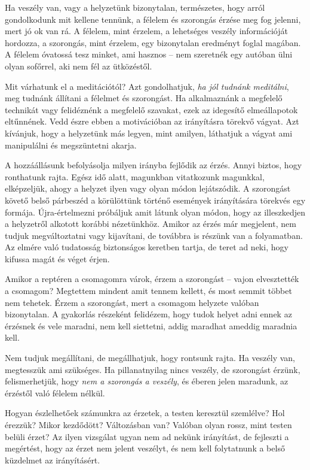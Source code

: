 
Ha veszély van, vagy a helyzetünk bizonytalan, természetes, hogy arról
gondolkodunk mit kellene tennünk, a félelem és szorongás érzése meg fog
jelenni, mert jó ok van rá. A félelem, mint érzelem, a lehetséges
veszély információját hordozza, a szorongás, mint érzelem, egy
bizonytalan eredményt foglal magában. A félelem óvatossá tesz minket,
ami hasznos -- nem szeretnék egy autóban ülni olyan sofőrrel, aki nem
fél az ütközéstől.

Mit várhatunk el a meditációtól? Azt gondolhatjuk, \emph{ha jól tudnánk
meditálni}, meg tudnánk állítani a félelmet és szorongást. Ha
alkalmaznánk a megfelelő technikát vagy felidéznénk a megfelelő
szavakat, ezek az idegesítő elmeállapotok eltűnnének. Vedd észre ebben a
motivációban az irányításra törekvő vágyat. Azt kívánjuk, hogy a
helyzetünk más legyen, mint amilyen, láthatjuk a vágyat ami manipulálni
és megszüntetni akarja.

A hozzáállásunk befolyásolja milyen irányba fejlődik az érzés. Annyi
biztos, hogy ronthatunk rajta. Egész idő alatt, magunkban vitatkozunk
magunkkal, elképzeljük, ahogy a helyzet ilyen vagy olyan módon
lejátszódik. A szorongást követő belső párbeszéd a körülöttünk történő
események irányítására törekvés egy formája. Újra-értelmezni próbáljuk
amit látunk olyan módon, hogy az illeszkedjen a helyzetről alkotott
korábbi nézetünkhöz. Amikor az érzés már megjelent, nem tudjuk
megváltoztatni vagy kijavítani, de továbbra is részünk van a
folyamatban. Az elmére való tudatosság biztonságos keretben tartja, de
teret ad neki, hogy kifussa magát és véget érjen.

Amikor a reptéren a csomagomra várok, érzem a szorongást -- vajon
elvesztették a csomagom? Megtettem mindent amit tennem kellett, és most
semmit többet nem tehetek. Érzem a szorongást, mert a csomagom helyzete
valóban bizonytalan. A gyakorlás részeként felidézem, hogy tudok helyet
adni ennek az érzésnek és vele maradni, nem kell siettetni, addig
maradhat ameddig maradnia kell.

Nem tudjuk megállítani, de megállhatjuk, hogy rontsunk rajta. Ha veszély
van, megtesszük ami szükséges. Ha pillanatnyilag nincs veszély, de
szorongást érzünk, felismerhetjük, hogy \emph{nem a szorongás a
veszély}, és éberen jelen maradunk, az érzéstől való félelem nélkül.


Hogyan észlelhetőek számunkra az érzetek, a testen keresztül szemlélve?
Hol érezzük? Mikor kezdődött? Változásban van? Valóban olyan rossz, mint
testen belüli érzet? Az ilyen vizsgálat ugyan nem ad nekünk irányítást,
de fejleszti a megértést, hogy az érzet nem jelent veszélyt, és nem kell
folytatnunk a belső küzdelmet az irányításért.

